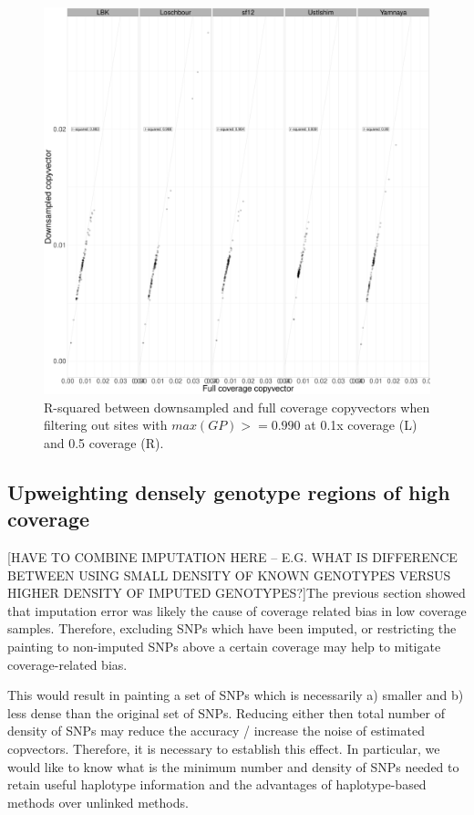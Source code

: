 \begin{figure}[htp]
    \centering
    \includegraphics[width=1.0\textwidth]{../images/chapter1/CP_correlation_allSamples_0.1x_0.5x_30x.GP_filter.pdf}
    \caption{R-squared between downsampled and full coverage copyvectors when filtering out sites with $max(GP) >= 0.990$ at 0.1x coverage (L) and 0.5 coverage (R).}
    \label{fig:CP_correlation_allSamples_0.1x_0.5x_30x.GP_filter}
\end{figure}


\subsection{Upweighting densely genotype regions of high coverage}

{\color{red}[HAVE TO COMBINE IMPUTATION HERE -- E.G. WHAT IS DIFFERENCE BETWEEN USING SMALL DENSITY OF KNOWN GENOTYPES VERSUS HIGHER DENSITY OF IMPUTED GENOTYPES?]}The previous section showed that imputation error was likely the cause of coverage related bias in low coverage samples. Therefore, excluding SNPs which have been imputed, or restricting the painting to non-imputed SNPs above a certain coverage may help to mitigate coverage-related bias.

This would result in painting a set of SNPs which is necessarily a) smaller and b) less dense than the original set of SNPs. Reducing either then total number of density of SNPs may reduce the accuracy / increase the noise of estimated copvectors. Therefore, it is necessary to establish this effect. In particular, we would like to know what is the minimum number and density of SNPs needed to retain useful haplotype information and the advantages of haplotype-based methods over unlinked methods. 

